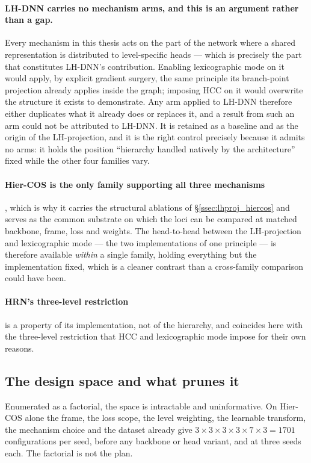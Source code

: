 \paragraph{LH-DNN carries no mechanism arms, and this is an argument rather than a
gap.} Every mechanism in this thesis acts on the part of the network where a
shared representation is distributed to level-specific heads --- which is
precisely the part that constitutes LH-DNN's contribution. Enabling lexicographic
mode on it would apply, by explicit gradient surgery, the same principle its
branch-point projection already applies inside the graph; imposing HCC on it would
overwrite the structure it exists to demonstrate. Any arm applied to LH-DNN
therefore either duplicates what it already does or replaces it, and a result from
such an arm could not be attributed to LH-DNN. It is retained as a baseline and as
the origin of the LH-projection, and it is the right control precisely because it
admits no arms: it holds the position ``hierarchy handled natively by the
architecture'' fixed while the other four families vary.

\paragraph{Hier-COS is the only family supporting all three mechanisms}, which is
why it carries the structural ablations of \S\ref{ssec:lhproj_hiercos} and serves
as the common substrate on which the loci can be compared at matched backbone,
frame, loss and weights. The head-to-head between the LH-projection and
lexicographic mode --- the two implementations of one principle --- is therefore
available \emph{within} a single family, holding everything but the implementation
fixed, which is a cleaner contrast than a cross-family comparison could have been.

\paragraph{HRN's three-level restriction} is a property of its implementation, not
of the hierarchy, and coincides here with the three-level restriction that HCC and
lexicographic mode impose for their own reasons.

\subsection{The design space and what prunes it}
\label{ssec:design_space}

Enumerated as a factorial, the space is intractable and uninformative. On Hier-COS
alone the frame, the loss scope, the level weighting, the learnable transform, the
mechanism choice and the dataset already give
$3\times3\times3\times3\times7\times3 = 1701$ configurations per seed, before any
backbone or head variant, and at three seeds each. The factorial is not the plan.

